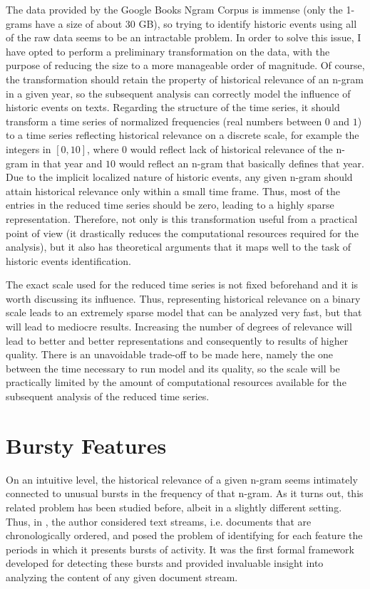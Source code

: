 The data provided by the Google Books Ngram Corpus is immense (only the 1-grams have a size of about $30$ GB), so trying to identify historic events using all of the raw data seems to be an intractable problem. In order to solve this issue, I have opted to perform a preliminary transformation on the data, with the purpose of reducing the size to a more manageable order of magnitude. Of course, the transformation should retain the property of historical relevance of an n-gram in a given year, so the subsequent analysis can correctly model the influence of historic events on texts. Regarding the structure of the time series, it should transform a time series of normalized frequencies (real numbers between $0$ and $1$) to a time series reflecting historical relevance on a discrete scale, for example the integers in $\left[ 0, 10 \right]$, where $0$ would reflect lack of historical relevance of the n-gram in that year and $10$ would reflect an n-gram that basically defines that year. Due to the implicit localized nature of historic events, any given n-gram should attain historical relevance only within a small time frame. Thus, most of the entries in the reduced time series should be zero, leading to a highly sparse representation. Therefore, not only is this transformation useful from a practical point of view (it drastically reduces the computational resources required for the analysis), but it also has theoretical arguments that it maps well to the task of historic events identification.

The exact scale used for the reduced time series is not fixed beforehand and it is worth discussing its influence. Thus, representing historical relevance on a binary scale leads to an extremely sparse model that can be analyzed very fast, but that will lead to mediocre results. Increasing the number of degrees of relevance will lead to better and better representations and consequently to results of higher quality. There is an unavoidable trade-off to be made here, namely the one between the time necessary to run model and its quality, so the scale will be practically limited by the amount of computational resources available for the subsequent analysis of the reduced time series.

\section{Bursty Features}
\label{sec:bursty-features}

On an intuitive level, the historical relevance of a given n-gram seems intimately connected to unusual bursts in the frequency of that n-gram. As it turns out, this related problem has been studied before, albeit in a slightly different setting. Thus, in \cite{Kleinberg:2002:BHS:775047.775061}, the author considered text streams, i.e. documents that are chronologically ordered, and posed the problem of identifying for each feature the periods in which it presents bursts of activity. It was the first formal framework developed for detecting these bursts and provided invaluable insight into analyzing the content of any given document stream.

